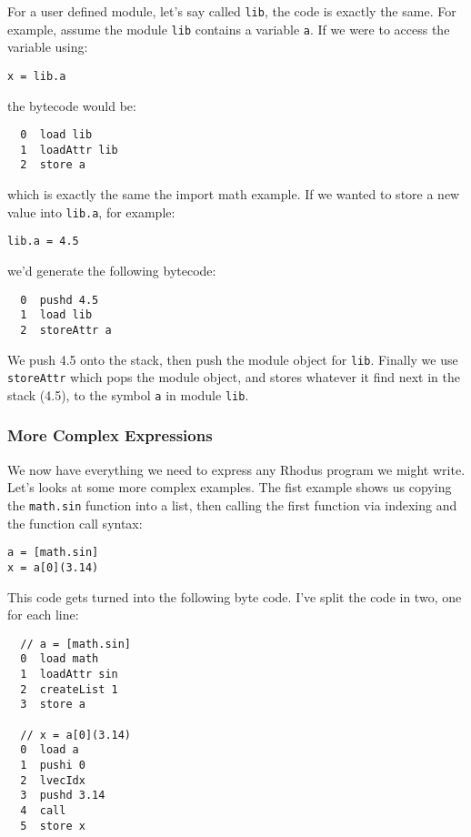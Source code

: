 For a user defined module, let's say called {\tt lib}, the code is exactly the same. For example, assume the module {\tt lib} contains a variable {\tt a}. If we were to access the variable using:

\begin{lstlisting}
x = lib.a
\end{lstlisting}

the bytecode would be:

\begin{lstlisting}
  0  load lib
  1  loadAttr lib
  2  store a
\end{lstlisting}

which is exactly the same the import math example.  If we wanted to store a new value into {\tt lib.a}, for example:

\begin{lstlisting}
lib.a = 4.5
\end{lstlisting}

we'd generate the following bytecode:

\begin{lstlisting}
  0  pushd 4.5
  1  load lib
  2  storeAttr a
\end{lstlisting}

We push 4.5 onto the stack, then push the module object for {\tt lib}. Finally we use {\tt storeAttr} which pops the module object, and stores whatever it find next in the stack (4.5), to the symbol {\tt a} in module {\tt lib}.

\subsubsection*{More Complex Expressions}

We now have everything we need to express any Rhodus program we might write. Let's looks at some more complex examples. The fist example shows us copying the {\tt math.sin} function into a list, then calling the first function via indexing and the function call syntax:

\begin{lstlisting}
a = [math.sin]
x = a[0](3.14)
\end{lstlisting}

This code gets turned into the following byte code. I've split the code in two, one for each line:

\begin{lstlisting}
  // a = [math.sin]
  0  load math
  1  loadAttr sin
  2  createList 1
  3  store a

  // x = a[0](3.14)
  0  load a
  1  pushi 0
  2  lvecIdx
  3  pushd 3.14
  4  call
  5  store x
\end{lstlisting}

